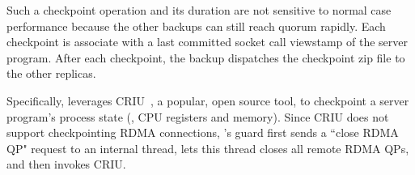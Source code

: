 Such a checkpoint operation and its duration are not sensitive to normal case
performance because the other backups can still reach quorum rapidly. Each 
checkpoint is associate with a last committed socket call viewstamp of the 
server program. After each checkpoint, the backup dispatches the checkpoint zip 
file to the other replicas.

Specifically, \xxx leverages CRIU~\cite{criu}, a popular, open source tool, to 
checkpoint a server program's process state (\eg, CPU registers and memory). 
Since CRIU does not support checkpointing RDMA connections, \xxx's guard first 
sends a ``close RDMA QP" request to an \xxx internal thread, lets this thread 
closes all remote RDMA QPs, and then invokes CRIU.




